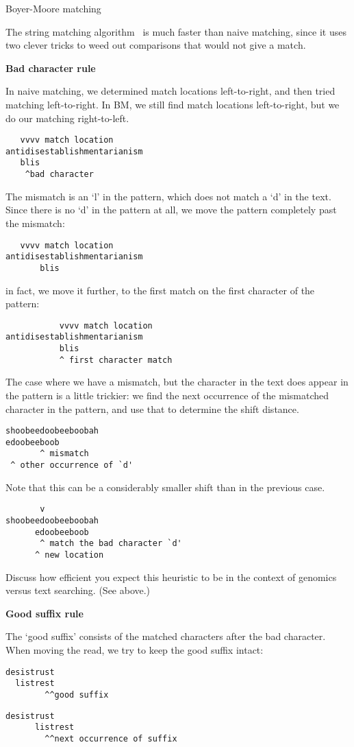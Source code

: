  {Boyer-Moore matching}

The  string matching algorithm~\cite{BoyerMoore:cacm77}
is much faster than naive matching,
since it uses two clever tricks to weed out comparisons that would
not give a match.

\textbf{Bad character rule}

In naive matching, we determined match locations left-to-right,
and then tried matching left-to-right.
In \ac{BM}, we still find match locations left-to-right, but
we do our matching right-to-left.

\begin{verbatim}
   vvvv match location
antidisestablishmentarianism
   blis
    ^bad character   
\end{verbatim}
The mismatch is an `l' in the pattern, which does not match a `d' in the text.
Since there is no `d' in the pattern at all,
we move the pattern completely past the mismatch:
\begin{verbatim}
   vvvv match location
antidisestablishmentarianism
       blis
\end{verbatim}
in fact, we move it further, to the first match on the first character of the pattern:
\begin{verbatim}
           vvvv match location
antidisestablishmentarianism
           blis
           ^ first character match
\end{verbatim}

The case where we have a mismatch, but the character in the text does
appear in the pattern is a little trickier:
we find the next occurrence of the mismatched character in the pattern,
and use that to determine the shift distance.
\begin{verbatim}
shoobeedoobeeboobah
edoobeeboob
       ^ mismatch
 ^ other occurrence of `d'
\end{verbatim}
Note that this can be a considerably smaller shift than in the previous case.
\begin{verbatim}
       v
shoobeedoobeeboobah
      edoobeeboob
       ^ match the bad character `d'
      ^ new location
\end{verbatim}

\begin{exercise}
  Discuss how efficient you expect this heuristic to be
  in the context of genomics versus text searching. (See above.)
\end{exercise}

\textbf{Good suffix rule}

The `good suffix' consists of the matched characters
after the bad character.
When moving the read,
we try to keep the good suffix intact:

\begin{verbatim}
desistrust
  listrest
        ^^good suffix
\end{verbatim}

\begin{verbatim}
desistrust
      listrest
        ^^next occurrence of suffix
\end{verbatim}

